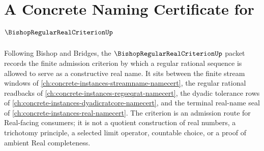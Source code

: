 \chapter{A Concrete Naming Certificate for $\BishopRegularRealCriterionUp$}
\label{ch:concrete-instances-bishop-regular-real-criterion-namecert}

Following Bishop and Bridges, the $\BishopRegularRealCriterionUp$ packet records the finite admission criterion by which a regular rational sequence is allowed to serve as a constructive real name. It sits between the finite stream windows of \autoref{ch:concrete-instances-streamname-namecert}, the regular rational readbacks of \autoref{ch:concrete-instances-regseqrat-namecert}, the dyadic tolerance rows of \autoref{ch:concrete-instances-dyadicratcore-namecert}, and the terminal real-name seal of \autoref{ch:concrete-instances-real-namecert}. The criterion is an admission route for Real-facing consumers; it is not a quotient construction of real numbers, a trichotomy principle, a selected limit operator, countable choice, or a proof of ambient Real completeness.

